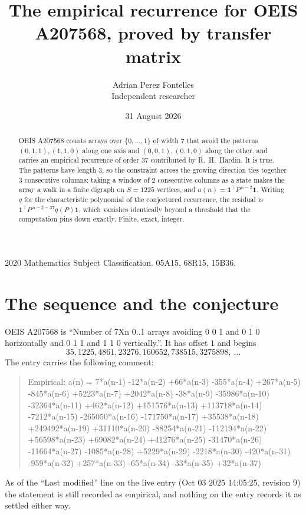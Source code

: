 \documentclass[11pt,a4paper]{article}
\title{The empirical recurrence for OEIS A207568, proved by transfer matrix}
\author{Adrian Perez Fontelles\\ \small Independent researcher}
\date{31 August 2026}
\theoremstyle{plain}
\theoremstyle{definition}
\begin{document}
\maketitle

\begin{abstract}
OEIS A207568 counts arrays over $\{0,\dots,1\}$ of width $7$ that avoid the patterns
$(0,1,1), (1,1,0)$ along one axis and $(0,0,1), (0,1,0)$ along the other, and carries an empirical recurrence of
order $37$ contributed by R.~H.~Hardin. It is true. The patterns have length $3$, so
the constraint across the growing direction ties together $3$ consecutive columns: taking a
window of $2$ consecutive columns as a state makes the array a walk in a finite digraph
on $S=1225$ vertices, and $a(n)=\mathbf{1}^{\!\top}P^{\,n-2}\mathbf{1}$. Writing $q$
for the characteristic polynomial of the conjectured recurrence, the residual is
$\mathbf{1}^{\!\top}P^{\,n-2-37}q(P)\mathbf{1}$, which vanishes identically
beyond a threshold that the computation pins down exactly. Finite, exact, integer.
\end{abstract}

\noindent\small 2020 Mathematics Subject Classification. 05A15, 68R15, 15B36.\normalsize

\section{The sequence and the conjecture}

OEIS A207568 is ``Number of 7Xn 0..1 arrays avoiding 0 0 1 and 0 1 0 horizontally and 0 1 1 and 1 1 0 vertically.''. It has offset
$1$ and begins
\[
35, 1225, 4861, 23276, 160652, 738515, 3275898,\ \dots
\]
The entry carries the following comment:
\begin{quote}\small
Empirical: a(n) = 7*a(n-1) -12*a(n-2) +66*a(n-3) -355*a(n-4) +267*a(n-5) -845*a(n-6) +5223*a(n-7) +2042*a(n-8) -38*a(n-9) -35986*a(n-10) -32364*a(n-11) +462*a(n-12) +151576*a(n-13) +113718*a(n-14) -7212*a(n-15) -265050*a(n-16) -171750*a(n-17) +35538*a(n-18) +249492*a(n-19) +31110*a(n-20) -88254*a(n-21) -112194*a(n-22) +56598*a(n-23) +69082*a(n-24) +41276*a(n-25) -31470*a(n-26) -11664*a(n-27) -1085*a(n-28) +5229*a(n-29) -2218*a(n-30) -420*a(n-31) -959*a(n-32) +257*a(n-33) -65*a(n-34) -33*a(n-35) +32*a(n-37)
\end{quote}
As of the ``Last modified'' line on the live entry (Oct 03 2025 14:05:25, revision
9) the statement is still recorded as empirical, and nothing on the entry
records it as settled either way.
\end{document}
